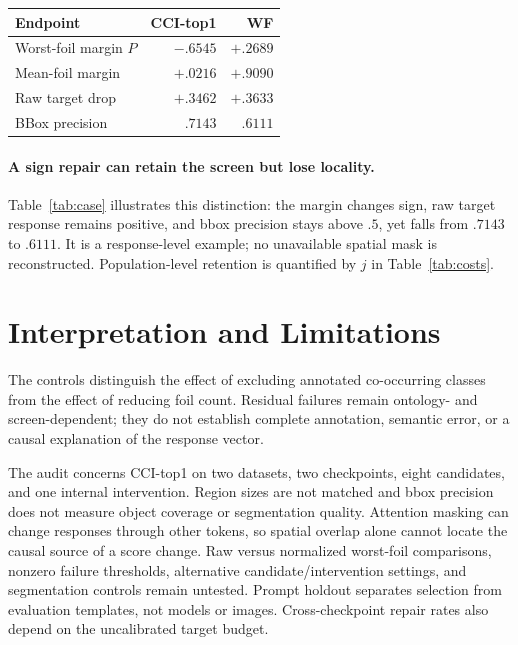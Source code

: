 \documentclass[10pt]{article}
\begin{document}
\noindent\begin{minipage}{\columnwidth}
\centering
{}
\label{tab:case}
\small
\begin{tabular*}{\columnwidth}{@{\extracolsep{\fill}}lrr@{}}
\toprule
Endpoint & CCI-top1 & WF\\
\midrule
Worst-foil margin $P$ & $-.6545$ & $+.2689$\\
Mean-foil margin & $+.0216$ & $+.9090$\\
Raw target drop & $+.3462$ & $+.3633$\\
BBox precision & $.7143$ & $.6111$\\
\bottomrule
\end{tabular*}
\end{minipage}\par\vspace{6pt}

\paragraph{A sign repair can retain the screen but lose locality.}
Table~\ref{tab:case} illustrates this distinction: the margin changes sign,
raw target response remains positive, and bbox precision stays above $.5$,
yet falls from $.7143$ to $.6111$. It is a response-level example;
no unavailable spatial mask is reconstructed. Population-level retention
is quantified by $j$ in Table~\ref{tab:costs}.

\section{Interpretation and Limitations}
The controls distinguish the effect of excluding annotated co-occurring
classes from the effect of reducing foil count. Residual failures remain ontology- and screen-dependent; they do not
establish complete annotation, semantic error, or a causal explanation of
the response vector.

The audit concerns CCI-top1 on two datasets, two checkpoints, eight candidates,
and one internal intervention. Region sizes are not matched and bbox precision
does not measure object coverage or segmentation quality. Attention masking
can change responses through other tokens, so spatial overlap alone cannot
locate the causal source of a score change. Raw versus normalized worst-foil
comparisons, nonzero failure thresholds, alternative candidate/intervention
settings, and segmentation controls remain untested. Prompt holdout separates
selection from evaluation templates, not models or images. Cross-checkpoint
repair rates also depend on the uncalibrated target budget.
\end{document}
